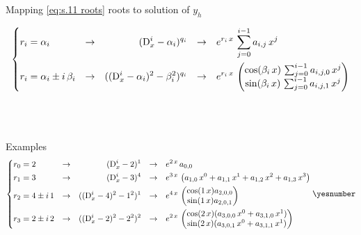 \documentclass["AM3C-Slides_annotations.tex"]{subfiles}
\begin{document}
\begin{sectionBox}
  Mapping \eqref{eq:s.11 roots} roots to solution of \(y_h\)
  \begin{tcolorbox}
    \label{sec:11 mapping roots to solution of y_h}
    \begin{gather*}
      \left\{
      \begin{align*}
        r_i &= \alpha_i
        & \to && 
        (\mdif[i]{x}-\alpha_i)^{q_i}
        && \to &&
        e^{r_i\,x}
        &
        \,\sum_{j=0}^{i-1}{
          a_{i,j}\,x^j
        }
        \\
        r_i &= \alpha_i \pm i\,\beta_i
        & \to &&
        ((\mdif[i]{x}-\alpha_i)^2-\beta_i^2)^{q_i}
        && \to &&
        e^{r_i\,x}
        &
        \,\begin{pmatrix}
          \cos(\beta_i\,x)
          \,\sum_{j=0}^{i-1}{
            a_{i,j,0}\,x^j
          }
          \\
          \sin(\beta_i\,x)
          \,\sum_{j=0}^{i-1}{
            a_{i,j,1}\,x^j
          }
        \end{pmatrix}
      \end{align*}
      \right.
      \vspace{10ex}
    \end{gather*}
    Examples
    \begin{gather*}
      \left\{
      \begin{align*}
        r_0 &= 2
        & \to && 
        (\mdif[i]{x}-2)^{1}
        && \to &&
        e^{2\,x}
        &
        \,a_{0,0}
        \\
        r_1 &= 3
        & \to && 
        (\mdif[i]{x}-3)^{4}
        && \to &&
        e^{3\,x}
        &
        \,\left(
          a_{1,0}\,x^0
          + a_{1,1}\,x^1
          + a_{1,2}\,x^2
          + a_{1,3}\,x^3
        \right)
        \\
        r_2 &= 4 \pm i\,1
        & \to &&
        ((\mdif[i]{x}-4)^2-1^2)^{1}
        && \to &&
        e^{4\,x}
        &
        \,\begin{pmatrix}
          \cos(1\,x) a_{2,0,0}
          \\
          \sin(1\,x) a_{2,0,1}
        \end{pmatrix}
        \\
        r_3 &= 2 \pm i\,2
        & \to &&
        ((\mdif[i]{x}-2)^2-2^2)^{2}
        && \to &&
        e^{2\,x}
        &
        \,\begin{pmatrix}
          \cos(2\,x)
          (
            a_{3,0,0}\,x^0
            + a_{3,1,0}\,x^1
          )
          \\
          \sin(2\,x)
          (
            a_{3,0,1}\,x^0
            + a_{3,1,1}\,x^1
          )
        \end{pmatrix}
      \end{align*}
      \right.
      \yesnumber\label{eq:s.11 map polynom -> solution y}
    \end{gather*}
  \end{tcolorbox}


\end{sectionBox}
\end{document}
